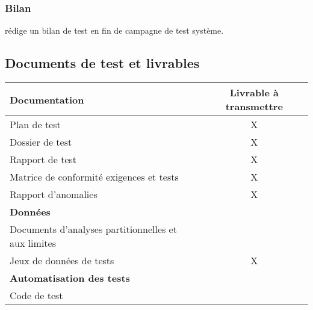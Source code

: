 \subsubsection{Bilan}

{\equipe} rédige un bilan de test en fin de campagne de test système.

\subsection{Documents de test et livrables}
\label{sec:process:livrables}

\noindent\begin{longtable}[c]{|l|c|}
\hline
{\bf Documentation} & {\bf Livrable à transmettre} \\
\hline
Plan de test & X \\
\hline
Dossier de test & X \\
\hline
Rapport de test & X \\
\hline
Matrice de conformité exigences et tests & X \\
\hline
Rapport d’anomalies & X \\
\hline
{\bf Données} & \\
\hline
Documents d'analyses partitionnelles et aux limites & \\
\hline
Jeux de données de tests & X\\
\hline
{\bf Automatisation des tests} & \\
\hline
Code de test & \\
\hline
\end{longtable}